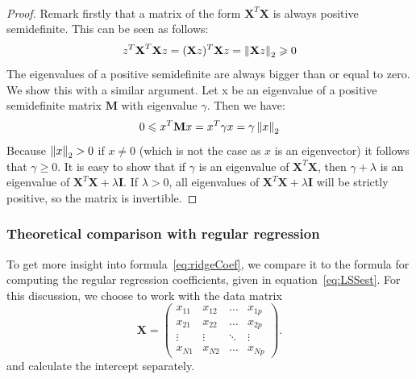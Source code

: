 \\
\begin{proof}
    Remark firstly that a matrix of the form $\textbf{X}^T\textbf{X}$ is always positive semidefinite. This can be seen as follows:
    \begin{equation*}
        z^T\textbf{X}^T\textbf{X}z = (\textbf{X}z)^T \textbf{X}z = \left\lVert\textbf{X}z\right\rVert_2 \geqslant 0
    \end{equation*}
    The eigenvalues of a positive semidefinite are always bigger than or equal to zero. We show this with a similar argument. Let x be an eigenvalue of a positive semidefinite matrix $\textbf{M}$ with eigenvalue $\gamma$. Then we have:
    \begin{equation*}
        0 \leqslant x^T\textbf{M}x = x^T \gamma x = \gamma \left\lVert x\right\rVert_2
    \end{equation*}
    Because $\left\lVert x\right\rVert_2 > 0$ if $x \neq 0$ (which is not the case as $x$ is an eigenvector) it follows that $\gamma \geqslant 0$. It is easy to show that if $\gamma$ is an eigenvalue of $\textbf{X}^T\textbf{X}$, then $\gamma + \lambda$ is an eigenvalue of $\textbf{X}^T\textbf{X} + \lambda \textbf{I}$. If $\lambda > 0$, all eigenvalues of $\textbf{X}^T\textbf{X} + \lambda \textbf{I}$ will be strictly positive, so the matrix is invertible.
\end{proof}


\subsubsection{Theoretical comparison with regular regression}
To get more insight into formula~\eqref{eq:ridgeCoef}, we compare it to the formula for computing the regular regression coefficients, given in equation~\eqref{eq:LSSest}. For this discussion, we choose to work with the data matrix
\begin{equation*}
    \textbf{X} = \begin{pmatrix}
    x_{11} & x_{12} & \dots & x_{1p}\\
    x_{21} & x_{22} & \dots & x_{2p}\\
    \vdots & \vdots & \ddots & \vdots\\
    x_{N1} & x_{N2} & \dots & x_{Np}
    \end{pmatrix}.
\end{equation*}
and calculate the intercept separately.

